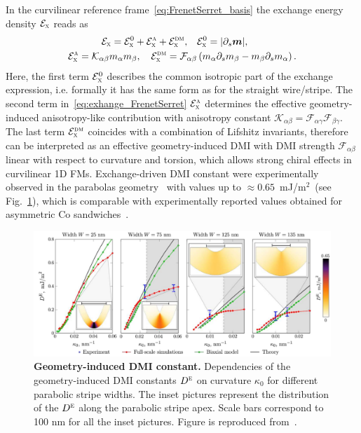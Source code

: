 \documentclass[runningheads]{llncs}
\begin{document}
In the curvilinear reference frame~\eqref{eq:FrenetSerret_basis} the exchange energy density $\mathcal{E}_\textsc{x}$ reads as~\cite{Sheka15}
\begin{equation}\label{eq:exhange_FrenetSerret}
\begin{split}
\mathcal{E}_\textsc{x}=\mathcal{E}_\textsc{x}^0+\mathcal{E}_\textsc{x}^\textsc{a}+\mathcal{E}_\textsc{x}^\textsc{dm},\quad &\mathcal{E}_\textsc{x}^0=|\partial_s\vec{m}|,\\
\mathcal{E}_\textsc{x}^\textsc{a}=\mathcal{K}_{\alpha\beta}m_\alpha m_\beta,\quad\mathcal{E}_\textsc{x}^\textsc{dm}=\mathcal{F}_{\alpha\beta}&\left(m_\alpha \partial_s m_\beta-m_\beta\partial_s m_\alpha\right).
\end{split}
\end{equation}
Here, the first term $\mathcal{E}_\textsc{x}^0$ describes the common isotropic part of the exchange expression, i.e. formally it has the same form as for the straight wire/stripe. The second term in~\eqref{eq:exhange_FrenetSerret} $\mathcal{E}_\textsc{x}^\textsc{a}$ determines the effective geometry-induced anisotropy-like contribution with anisotropy constant $\mathcal{K}_{\alpha\beta}=\mathcal{F}_{\alpha\gamma}\mathcal{F}_{\beta\gamma}$. The last term $\mathcal{E}_\textsc{x}^\textsc{dm}$ coincides with a combination of Lifshitz invariants, therefore can be interpreted as an effective geometry-induced DMI with DMI strength $\mathcal{F}_{\alpha\beta}$ linear with respect to curvature and torsion, which allows strong chiral effects in curvilinear 1D FMs. Exchange-driven DMI constant were experimentally observed in the parabolas geometry~\cite{Volkov19c} with values up to $\approx0.65$~mJ/m$^2$~(see Fig.~\ref{fig:dmi_parabola}), which is comparable with experimentally reported values obtained for asymmetric Co sandwiches~\cite{Boulle16}.

\begin{figure}[t]
	\includegraphics[width=\textwidth]{fig_dmi_parabola}
	\caption{\label{fig:dmi_parabola}%
		\textbf{Geometry-induced DMI constant.} Dependencies of the geometry-induced DMI constants $D^\textsc{e}$ on curvature $\kappa_0$ for different parabolic stripe widths. The inset
			pictures represent the distribution of the $D^\textsc{e}$ along the parabolic stripe apex. Scale bars correspond to 100 nm for all the inset pictures. Figure is reproduced from~\cite{Volkov19c}.}
\end{figure}
\end{document}
